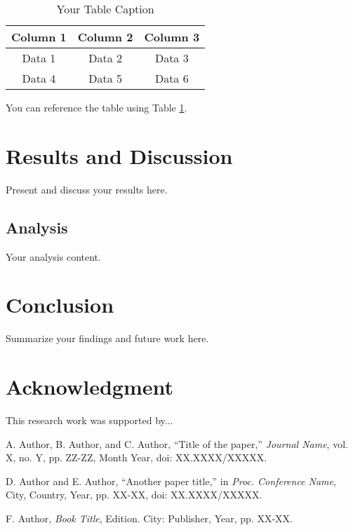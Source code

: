 \documentclass[conference]{IEEEtran}
\begin{document}
\begin{table}[htbp]
\caption{Your Table Caption}
\begin{center}
\begin{tabular}{|c|c|c|}
\hline
\textbf{Column 1} & \textbf{Column 2} & \textbf{Column 3} \\
\hline
Data 1 & Data 2 & Data 3 \\
\hline
Data 4 & Data 5 & Data 6 \\
\hline
\end{tabular}
\label{tab:example}
\end{center}
\end{table}

You can reference the table using Table \ref{tab:example}.

\section{Results and Discussion}
Present and discuss your results here.

\subsection{Analysis}
Your analysis content.

\section{Conclusion}
Summarize your findings and future work here.

\section*{Acknowledgment}
This research work was supported by...

\begin{thebibliography}{00}

 A. Author, B. Author, and C. Author, ``Title of the paper,'' \textit{Journal Name}, vol. X, no. Y, pp. ZZ-ZZ, Month Year, doi: XX.XXXX/XXXXX.

 D. Author and E. Author, ``Another paper title,'' in \textit{Proc. Conference Name}, City, Country, Year, pp. XX-XX, doi: XX.XXXX/XXXXX.

 F. Author, \textit{Book Title}, Edition. City: Publisher, Year, pp. XX-XX.


\end{thebibliography}
\end{document}
